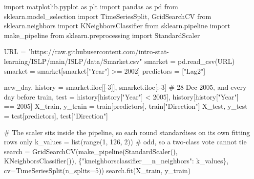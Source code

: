 \documentclass[
  letterpaper,
  10pt,
  twoside,
  openright,
  numbers=noenddot,
  chapterprefix=true]{scrbook}
\newenvironment{Shaded}{}{}
\newcommand{\BuiltInTok}[1]{\textcolor[rgb]{0.84,0.23,0.29}{#1}}
\newcommand{\CommentTok}[1]{\textcolor[rgb]{0.42,0.45,0.49}{#1}}
\newcommand{\DecValTok}[1]{\textcolor[rgb]{0.00,0.36,0.77}{#1}}
\newcommand{\ImportTok}[1]{\textcolor[rgb]{0.01,0.18,0.38}{#1}}
\newcommand{\NormalTok}[1]{\textcolor[rgb]{0.14,0.16,0.18}{#1}}
\newcommand{\OperatorTok}[1]{\textcolor[rgb]{0.14,0.16,0.18}{#1}}
\newcommand{\StringTok}[1]{\textcolor[rgb]{0.01,0.18,0.38}{#1}}
\begin{document}
\begin{Shaded}
\begin{Highlighting}[]
\ImportTok{import}\NormalTok{ matplotlib.pyplot }\ImportTok{as}\NormalTok{ plt}
\ImportTok{import}\NormalTok{ pandas }\ImportTok{as}\NormalTok{ pd}
\ImportTok{from}\NormalTok{ sklearn.model\_selection }\ImportTok{import}\NormalTok{ TimeSeriesSplit, GridSearchCV}
\ImportTok{from}\NormalTok{ sklearn.neighbors }\ImportTok{import}\NormalTok{ KNeighborsClassifier}
\ImportTok{from}\NormalTok{ sklearn.pipeline }\ImportTok{import}\NormalTok{ make\_pipeline}
\ImportTok{from}\NormalTok{ sklearn.preprocessing }\ImportTok{import}\NormalTok{ StandardScaler}

\NormalTok{URL }\OperatorTok{=} \StringTok{"https://raw.githubusercontent.com/intro{-}stat{-}learning/ISLP/main/ISLP/data/Smarket.csv"}
\NormalTok{smarket }\OperatorTok{=}\NormalTok{ pd.read\_csv(URL)}
\NormalTok{smarket }\OperatorTok{=}\NormalTok{ smarket[smarket[}\StringTok{"Year"}\NormalTok{] }\OperatorTok{\textgreater{}=} \DecValTok{2002}\NormalTok{]}
\NormalTok{predictors }\OperatorTok{=}\NormalTok{ [}\StringTok{"Lag2"}\NormalTok{]}

\NormalTok{new\_day, history }\OperatorTok{=}\NormalTok{ smarket.iloc[[}\OperatorTok{{-}}\DecValTok{3}\NormalTok{]], smarket.iloc[:}\OperatorTok{{-}}\DecValTok{3}\NormalTok{]     }\CommentTok{\# 28 Dec 2005, and every day before}
\NormalTok{train, test }\OperatorTok{=}\NormalTok{ history[history[}\StringTok{"Year"}\NormalTok{] }\OperatorTok{\textless{}} \DecValTok{2005}\NormalTok{], history[history[}\StringTok{"Year"}\NormalTok{] }\OperatorTok{==} \DecValTok{2005}\NormalTok{]}
\NormalTok{X\_train, y\_train }\OperatorTok{=}\NormalTok{ train[predictors], train[}\StringTok{"Direction"}\NormalTok{]}
\NormalTok{X\_test, y\_test }\OperatorTok{=}\NormalTok{ test[predictors], test[}\StringTok{"Direction"}\NormalTok{]}

\CommentTok{\# The scaler sits inside the pipeline, so each round standardises on its own fitting rows only}
\NormalTok{k\_values }\OperatorTok{=} \BuiltInTok{list}\NormalTok{(}\BuiltInTok{range}\NormalTok{(}\DecValTok{1}\NormalTok{, }\DecValTok{126}\NormalTok{, }\DecValTok{2}\NormalTok{))          }\CommentTok{\# odd, so a two{-}class vote cannot tie}
\NormalTok{search }\OperatorTok{=}\NormalTok{ GridSearchCV(make\_pipeline(StandardScaler(), KNeighborsClassifier()),}
\NormalTok{                      \{}\StringTok{"kneighborsclassifier\_\_n\_neighbors"}\NormalTok{: k\_values\},}
\NormalTok{                      cv}\OperatorTok{=}\NormalTok{TimeSeriesSplit(n\_splits}\OperatorTok{=}\DecValTok{5}\NormalTok{))}
\NormalTok{search.fit(X\_train, y\_train)}


\end{Highlighting}
\end{Shaded}
\end{document}
